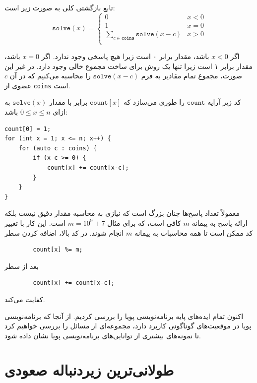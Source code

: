 تابع بازگشتی کلی به صورت زیر است:
\begin{equation*}
    \texttt{solve}(x) = \begin{cases}
               0               & x < 0\\
               1               & x = 0\\
               \sum_{c \in \texttt{coins}} \texttt{solve}(x-c) & x > 0 \\
           \end{cases}
\end{equation*}

اگر $x<0$ باشد، مقدار برابر ۰ است زیرا هیچ پاسخی وجود ندارد.
اگر $x=0$ باشد، مقدار برابر ۱ است زیرا تنها یک روش برای ساخت مجموع خالی وجود دارد.
در غیر این صورت، مجموع تمام مقادیر به فرم $\texttt{solve}(x-c)$ را محاسبه می‌کنیم که در آن $c$ عضوی از \texttt{coins} است.

کد زیر آرایه $\texttt{count}$ را طوری می‌سازد که
$\texttt{count}[x]$ برابر با مقدار $\texttt{solve}(x)$
به ازای $0 \le x \le n$ باشد:

\begin{lstlisting}
count[0] = 1;
for (int x = 1; x <= n; x++) {
    for (auto c : coins) {
        if (x-c >= 0) {
            count[x] += count[x-c];
        }
    }
}
\end{lstlisting}

معمولاً تعداد پاسخ‌ها چنان بزرگ است که نیازی به محاسبه مقدار دقیق نیست
بلکه ارائه پاسخ به پیمانه $m$ کافی است،
که برای مثال $m=10^9+7$ است.
این کار با تغییر کد ممکن است تا همه محاسبات به پیمانه $m$ انجام شوند.
در کد بالا، اضافه کردن سطر
\begin{lstlisting}
        count[x] %= m;
\end{lstlisting}
بعد از سطر
\begin{lstlisting}
        count[x] += count[x-c];
\end{lstlisting}
کفایت می‌کند.

اکنون تمام ایده‌های پایه برنامه‌نویسی پویا را بررسی کردیم.
از آنجا که برنامه‌نویسی پویا در موقعیت‌های گوناگونی کاربرد دارد،
مجموعه‌ای از مسائل را بررسی خواهیم کرد تا نمونه‌های بیشتری از توانایی‌های برنامه‌نویسی پویا نشان داده شود.

\section{طولانی‌ترین زیردنباله صعودی}


